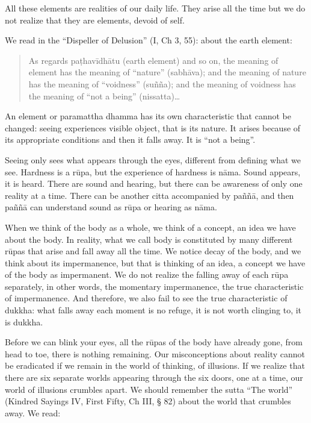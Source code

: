 All these elements are realities of our daily life. They arise all the time but we do not realize that they are elements, devoid of self.

We read in the ``Dispeller of Delusion'' (I, Ch 3, 55): about the earth element:

\begin{quote}
As regards paṭhavīdhātu (earth element) and so on, the meaning of element has the meaning of ``nature'' (sabhāva); and the meaning of nature has the meaning of ``voidness'' (suñña); and the meaning of voidness has the meaning of ``not a being'' (nissatta)\ldots
\end{quote}

An element or paramattha dhamma has its own characteristic that cannot be changed: seeing experiences visible object, that is its nature. It arises because of its appropriate conditions and then it falls away. It is ``not a being''.

Seeing only sees what appears through the eyes, different from defining what we see. Hardness is a rūpa, but the experience of hardness is nāma. Sound appears, it is heard. There are sound and hearing, but there can be awareness of only one reality at a time. There can be another citta accompanied by paññā, and then paññā can understand sound as rūpa or hearing as nāma.

When we think of the body as a whole, we think of a concept, an idea we have about the body. In reality, what we call body is constituted by many different rūpas that arise and fall away all the time. We notice decay of the body, and we think about its impermanence, but that is thinking of an idea, a concept we have of the body as impermanent. We do not realize the falling away of each rūpa separately, in other words, the momentary impermanence, the true characteristic of impermanence. And therefore, we also fail to see the true characteristic of dukkha: what falls away each moment is no refuge, it is not worth clinging to, it is dukkha.

Before we can blink your eyes, all the rūpas of the body have already gone, from head to toe, there is nothing remaining. Our misconceptions about reality cannot be eradicated if we remain in the world of thinking, of illusions. If we realize that there are six separate worlds appearing through the six doors, one at a time, our world of illusions crumbles apart. We should remember the sutta ``The world'' (Kindred Sayings IV, First Fifty, Ch III, § 82) about the world that crumbles away. We read:

